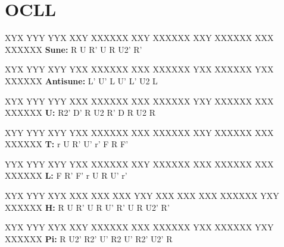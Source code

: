 \section{OCLL}

\begin{multicols}{2}

\RubikCubeGreyAll
\RubikFaceUp XYX YYY YYX
\RubikFaceFront XXY XXXXXX
\RubikFaceRight XXY XXXXXX
\RubikFaceBack XXY XXXXXX
\RubikFaceLeft XXX XXXXXX
\hspace{0.45cm}\textbf{Sune:} R U R' U R U2' R'
\vspace{0.2cm}

\RubikCubeGreyAll
\RubikFaceUp XYX YYY XYY
\RubikFaceFront YXX XXXXXX
\RubikFaceRight XXX XXXXXX
\RubikFaceBack YXX XXXXXX
\RubikFaceLeft YXX XXXXXX
\hspace{0.45cm}\textbf{Antisune:} L' U' L U' L' U2 L
\vspace{0.2cm}

\RubikCubeGreyAll
\RubikFaceUp XYX YYY YYY
\RubikFaceFront XXX XXXXXX
\RubikFaceRight XXX XXXXXX
\RubikFaceBack YXY XXXXXX
\RubikFaceLeft XXX XXXXXX
\hspace{0.45cm}\textbf{U:} R2' D' R U2 R' D R U2 R
\vspace{0.2cm}

\RubikCubeGreyAll
\RubikFaceUp XYY YYY XYY
\RubikFaceFront YXX XXXXXX
\RubikFaceRight XXX XXXXXX
\RubikFaceBack XXY XXXXXX
\RubikFaceLeft XXX XXXXXX
\hspace{0.45cm}\textbf{T:} r U R' U' r' F R F'
\vspace{0.2cm}

\RubikCubeGreyAll
\RubikFaceUp YYX YYY XYY
\RubikFaceFront YXX XXXXXX
\RubikFaceRight XXY XXXXXX
\RubikFaceBack XXX XXXXXX
\RubikFaceLeft XXX XXXXXX
\hspace{0.45cm}\textbf{L:} F R' F' r U R U' r'
\vspace{0.2cm}

\RubikCubeGreyAll
\RubikFaceUp XYX YYY XYX
\RubikFaceFront XXX XXX XXX
\RubikFaceRight YXY XXX XXX
\RubikFaceBack XXX XXXXXX
\RubikFaceLeft YXY XXXXXX
\hspace{0.45cm}\textbf{H:} R U R' U R U' R' U R U2' R'
\vspace{0.2cm}

\RubikCubeGreyAll
\RubikFaceUp XYX YYY XYX
\RubikFaceFront XXY XXXXXX
\RubikFaceRight XXX XXXXXX
\RubikFaceBack YXX XXXXXX
\RubikFaceLeft YXY XXXXXX
\hspace{0.2cm}\textbf{Pi:} R U2' R2' U' R2 U' R2' U2' R

\end{multicols}


